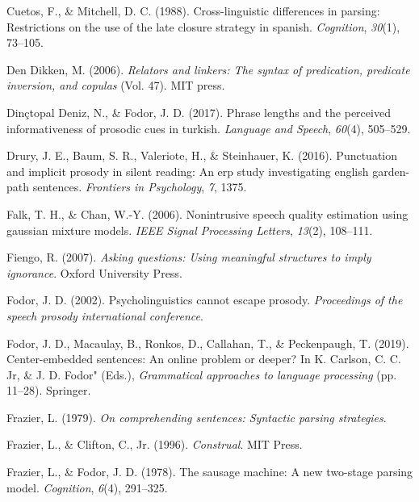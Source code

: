 \documentclass[11pt,oneside]{book}
\begin{document}
\leavevmode\hypertarget{ref-Cuetos1988-tm}{}%
Cuetos, F., \& Mitchell, D. C. (1988). Cross-linguistic differences in parsing: Restrictions on the use of the late closure strategy in spanish. \emph{Cognition}, \emph{30}(1), 73--105.

\leavevmode\hypertarget{ref-den2006relators}{}%
Den Dikken, M. (2006). \emph{Relators and linkers: The syntax of predication, predicate inversion, and copulas} (Vol. 47). MIT press.

\leavevmode\hypertarget{ref-nazik}{}%
Dinçtopal Deniz, N., \& Fodor, J. D. (2017). Phrase lengths and the perceived informativeness of prosodic cues in turkish. \emph{Language and Speech}, \emph{60}(4), 505--529.

\leavevmode\hypertarget{ref-cps}{}%
Drury, J. E., Baum, S. R., Valeriote, H., \& Steinhauer, K. (2016). Punctuation and implicit prosody in silent reading: An erp study investigating english garden-path sentences. \emph{Frontiers in Psychology}, \emph{7}, 1375.

\leavevmode\hypertarget{ref-gmm1}{}%
Falk, T. H., \& Chan, W.-Y. (2006). Nonintrusive speech quality estimation using gaussian mixture models. \emph{IEEE Signal Processing Letters}, \emph{13}(2), 108--111.

\leavevmode\hypertarget{ref-fiengo}{}%
Fiengo, R. (2007). \emph{Asking questions: Using meaningful structures to imply ignorance}. Oxford University Press.

\leavevmode\hypertarget{ref-Fodor2002-io}{}%
Fodor, J. D. (2002). Psycholinguistics cannot escape prosody. \emph{Proceedings of the speech prosody international conference}.

\leavevmode\hypertarget{ref-fodor2019center}{}%
Fodor, J. D., Macaulay, B., Ronkos, D., Callahan, T., \& Peckenpaugh, T. (2019). Center-embedded sentences: An online problem or deeper? In K. Carlson, C. C. Jr, \& J. D. Fodor" (Eds.), \emph{Grammatical approaches to language processing} (pp. 11--28). Springer.

\leavevmode\hypertarget{ref-Frazier1979-pb}{}%
Frazier, L. (1979). \emph{On comprehending sentences: Syntactic parsing strategies}.

\leavevmode\hypertarget{ref-frazier1996construal}{}%
Frazier, L., \& Clifton, C., Jr. (1996). \emph{Construal}. MIT Press.

\leavevmode\hypertarget{ref-frazier1978sausage}{}%
Frazier, L., \& Fodor, J. D. (1978). The sausage machine: A new two-stage parsing model. \emph{Cognition}, \emph{6}(4), 291--325.
\end{document}
